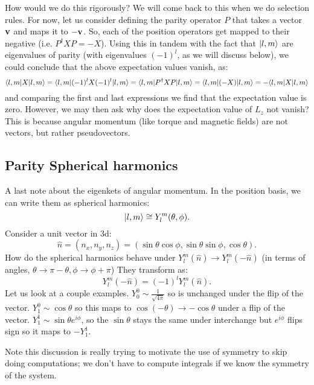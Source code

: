 How would we do this rigorously? We will come back to this when we do selection rules. For now, let us consider defining the parity operator $P$ that takes a vector $\mathbf{v}$ and maps it to $-\mathbf{v}$. So, each of the position operators get mapped to their negative (i.e. $P^\dagger XP= -X$). Using this in tandem with the fact that $\lvert l, m \rangle$ are eigenvalues of parity (with eigenvalues $(-1)^l$, as we will discuss below), we could conclude that the above expectation values vanish, as:
\begin{equation}
    \langle l, m \rvert X \lvert l, m \rangle = \langle l, m \rvert(-1)^l X (-1)^l \lvert l, m \rangle = \langle l, m \rvert P^\dagger X P\lvert l, m \rangle = \langle l, m \rvert(-X)\lvert l, m \rangle = -\langle l, m \rvert X\lvert l, m \rangle
\end{equation}
and comparing the first and last expressions we find that the expectation value is zero. However, we may then ask why does the expectation value of $L_z$ not vanish? This is because angular momentum (like torque and magnetic fields) are not vectors, but rather pseudovectors.

\subsection{Parity Spherical harmonics}
A last note about the eigenkets of angular momentum. In the position basis, we can write them as spherical harmonics:
\begin{equation}
    \ket{l, m} \cong Y_{l}^m(\theta, \phi).
\end{equation}
Consider a unit vector in 3d:
\begin{equation}
    \hat{n} = (n_x, n_y, n_z) = (\sin\theta\cos\phi, \sin\theta\sin\phi, \cos\theta).
\end{equation}
How do the spherical harmonics behave under $Y_l^m(\hat{n}) \to Y_l^m(-\hat{n})$ (in terms of angles, $\theta \to \pi - \theta, \phi \to \phi + \pi$) They transform as:
\begin{equation}
    Y_l^m(-\hat{n}) = (-1)^lY_{l}^m(\hat{n}).
\end{equation}
Let us look at a couple examples. $Y_0^0 \sim \frac{1}{\sqrt{4\pi}}$ so is unchanged under the flip of the vector. $Y_1^0 \sim \cos\theta$ so this maps to $\cos(-\theta) \to -\cos\theta$ under a flip of the vector. $Y_1^1 \sim \sin\theta e^{i\phi}$, so the $\sin\theta$ stays the same under interchange but $e^{i\phi}$ flips sign so it maps to $-Y_1^1$. 

Note this discussion is really trying to motivate the use of symmetry to skip doing computations; we don't have to compute integrals if we know the symmetry of the system.

